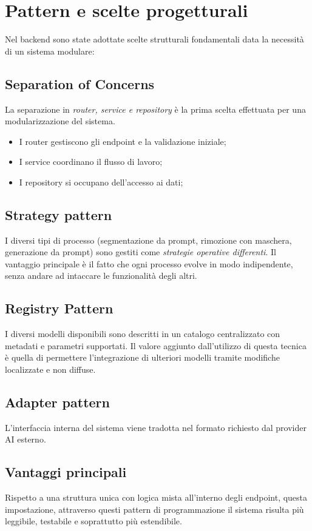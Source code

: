 \documentclass[oneside]{supsistudent}
\begin{document}
\section{Pattern e scelte progetturali}
Nel backend sono state adottate scelte strutturali fondamentali data la necessità di un sistema modulare:

\subsection{Separation of Concerns}
La separazione in \emph{router, service e repository} è la prima scelta effettuata per una modularizzazione del sistema.
\begin{itemize}
  \item I router gestiscono gli endpoint e la validazione iniziale;
  \item I service coordinano il flusso di lavoro;
  \item I repository si occupano dell'accesso ai dati;
\end{itemize}

\subsection{Strategy pattern}
I diversi tipi di processo (segmentazione da prompt, rimozione con maschera, generazione da prompt)
sono gestiti come \emph{strategie operative differenti}. Il vantaggio principale è il fatto che ogni processo evolve in modo
indipendente, senza andare ad intaccare le funzionalità degli altri.

\subsection{Registry Pattern}
I diversi modelli disponibili sono descritti in un catalogo centralizzato con metadati e parametri supportati. Il valore aggiunto
dall'utilizzo di questa tecnica è quella di permettere l'integrazione di ulteriori modelli tramite modifiche localizzate e non diffuse.

\subsection{Adapter pattern}
L'interfaccia interna del sistema viene tradotta nel formato richiesto dal provider AI esterno.

\subsection{Vantaggi principali}
Rispetto a una struttura unica con logica mista all'interno degli endpoint, questa impostazione, attraverso questi pattern di programmazione il sistema risulta più leggibile,
testabile e soprattutto più estendibile.
\end{document}
